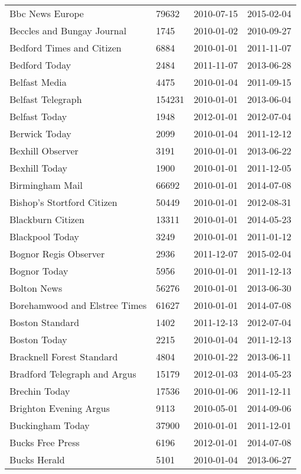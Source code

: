 \begin{longtable}{p{}p{}p{}p{}}
  Bbc News Europe & 79632 & 2010-07-15 & 2015-02-04 \\ 
  Beccles and Bungay Journal & 1745 & 2010-01-02 & 2010-09-27 \\ 
  Bedford Times and Citizen & 6884 & 2010-01-01 & 2011-11-07 \\ 
  Bedford Today & 2484 & 2011-11-07 & 2013-06-28 \\ 
  Belfast Media & 4475 & 2010-01-04 & 2011-09-15 \\ 
  Belfast Telegraph & 154231 & 2010-01-01 & 2013-06-04 \\ 
  Belfast Today & 1948 & 2012-01-01 & 2012-07-04 \\ 
  Berwick Today & 2099 & 2010-01-04 & 2011-12-12 \\ 
  Bexhill Observer & 3191 & 2010-01-01 & 2013-06-22 \\ 
  Bexhill Today & 1900 & 2010-01-01 & 2011-12-05 \\ 
  Birmingham Mail & 66692 & 2010-01-01 & 2014-07-08 \\ 
  Bishop's Stortford Citizen & 50449 & 2010-01-01 & 2012-08-31 \\ 
  Blackburn Citizen & 13311 & 2010-01-01 & 2014-05-23 \\ 
  Blackpool Today & 3249 & 2010-01-01 & 2011-01-12 \\ 
  Bognor Regis Observer & 2936 & 2011-12-07 & 2015-02-04 \\ 
  Bognor Today & 5956 & 2010-01-01 & 2011-12-13 \\ 
  Bolton News & 56276 & 2010-01-01 & 2013-06-30 \\ 
  Borehamwood and Elstree Times & 61627 & 2010-01-01 & 2014-07-08 \\ 
  Boston Standard & 1402 & 2011-12-13 & 2012-07-04 \\ 
  Boston Today & 2215 & 2010-01-04 & 2011-12-13 \\ 
  Bracknell Forest Standard & 4804 & 2010-01-22 & 2013-06-11 \\ 
  Bradford Telegraph and Argus & 15179 & 2012-01-03 & 2014-05-23 \\ 
  Brechin Today & 17536 & 2010-01-06 & 2011-12-11 \\ 
  Brighton Evening Argus & 9113 & 2010-05-01 & 2014-09-06 \\ 
  Buckingham Today & 37900 & 2010-01-01 & 2011-12-01 \\ 
  Bucks Free Press & 6196 & 2012-01-01 & 2014-07-08 \\ 
  Bucks Herald & 5101 & 2010-01-04 & 2013-06-27 \\ 

\end{longtable}
